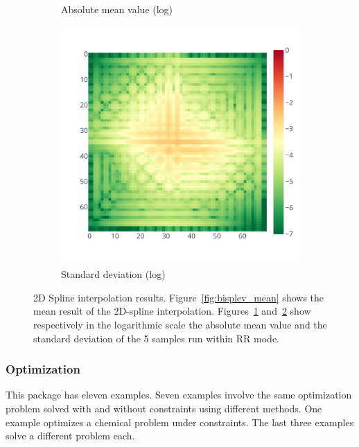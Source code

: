 \documentclass[11pt]{article}
\newcommand{\tristan}[1]{\color{orange}\textbf{From Tristan:} #1\color{black}\xspace}
\begin{document}
\begin{figure}
\begin{subfigure}{.3\textwidth}
    \caption{Absolute mean value (log)}
    \label{fig:bisplev_mean_log}
\end{subfigure}
\begin{subfigure}{.3\textwidth}
    \centering
    \includegraphics[width=\linewidth]{figure/spline_2d/bisplev_std_log.pdf}
    \caption{Standard deviation (log)}
    \label{fig:bisplev_std_log}
\end{subfigure}
    \caption{2D Spline interpolation results. Figure~\ref{fig:bisplev_mean} shows the mean result
    of the 2D-spline interpolation. Figures~\ref{fig:bisplev_mean_log} and~\ref{fig:bisplev_std_log}
    show respectively in the logarithmic scale the absolute mean value and the standard deviation 
    of the 5 samples run within RR mode. 
    }
    \label{fig:spline2d_rr}
\end{figure}


\subsubsection{Optimization}

This package has eleven examples. Seven examples involve the same optimization problem 
solved with and without constraints using different methods.
One example optimizes a chemical problem under constraints.
The last three examples solve a different problem each.
\end{document}
